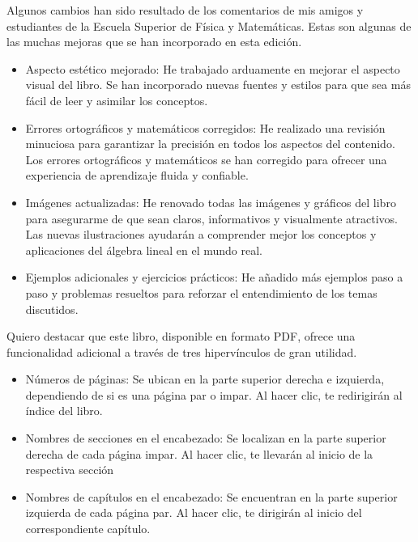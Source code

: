 Algunos cambios han sido resultado de los comentarios de mis amigos y estudiantes de la Escuela Superior de Física y Matemáticas. Estas son algunas de las muchas mejoras que se han incorporado en esta edición.
\begin{itemize}
    \item Aspecto estético mejorado: He trabajado arduamente en mejorar el aspecto visual del libro. Se han incorporado nuevas fuentes y estilos para que sea más fácil de leer y asimilar los conceptos.
    \item Errores ortográficos y matemáticos corregidos: He realizado una revisión minuciosa para garantizar la precisión en todos los aspectos del contenido. Los errores ortográficos y matemáticos se han corregido para ofrecer una experiencia de aprendizaje fluida y confiable.
    \item Imágenes actualizadas: He renovado todas las imágenes y gráficos del libro para asegurarme de que sean claros, informativos y visualmente atractivos. Las nuevas ilustraciones ayudarán a comprender mejor los conceptos y aplicaciones del álgebra lineal en el mundo real.
    \item Ejemplos adicionales y ejercicios prácticos: He añadido más ejemplos paso a paso y problemas resueltos para reforzar el entendimiento de los temas discutidos.
\end{itemize}
Quiero destacar que este libro, disponible en formato PDF, ofrece una funcionalidad adicional a través de tres hipervínculos de gran utilidad.
\begin{itemize}
    \item Números de páginas: Se ubican en la parte superior derecha e izquierda, dependiendo de si es una página par o impar. Al hacer clic, te redirigirán al índice del libro.
    \item Nombres de secciones en el encabezado: Se localizan en la parte superior derecha de cada página impar. Al hacer clic, te llevarán al inicio de la respectiva sección
    \item Nombres de capítulos en el encabezado: Se encuentran en la parte superior izquierda de cada página par. Al hacer clic, te dirigirán al inicio del correspondiente capítulo.
\end{itemize}

